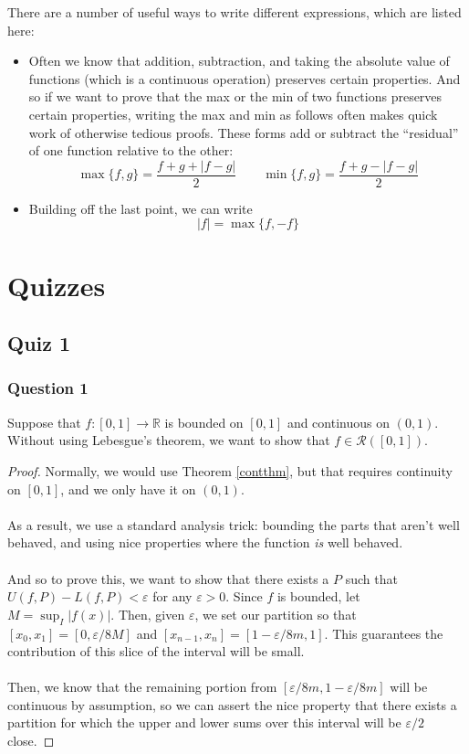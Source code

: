 \documentclass[12pt]{article}
\theoremstyle{plain}
\theoremstyle{definition}
\theoremstyle{remark}
\begin{document}
There are a number of useful ways to write different expressions, which are listed here:
\begin{itemize}
\item Often we know that addition, subtraction, and taking the absolute value of functions (which is a continuous operation) preserves certain properties. And so if we want to prove that the max or the min of two functions preserves certain properties, writing the max and min as follows often makes quick work of otherwise tedious proofs. These forms add or subtract the ``residual'' of one function relative to the other: 
\[
    \max \{f,g\} = \frac{f+g+|f-g|}{2}\qquad 
    \min\{f,g\} = \frac{f+g-|f-g|}{2}
\]

\item Building off the last point, we can write 
    \[ 
        |f|=\max\{f,-f\}
    \]
\end{itemize}

\newpage
\section{Quizzes}

\subsection{Quiz 1}

\subsubsection{Question 1}

Suppose that $f: [0,1]\rightarrow \mathbb{R}$ is bounded on $[0,1]$ and continuous on $(0,1)$. Without using Lebesgue's theorem, we want to show that $f\in\mathscr{R}([0,1])$.
\begin{proof}
Normally, we would use Theorem \ref{contthm}, but that requires continuity on $[0,1]$, and we only have it on $(0,1)$.
\\
\\
As a result, we use a standard analysis trick: bounding the parts that aren't well behaved, and using nice properties where the function \emph{is} well behaved.
\\
\\
And so to prove this, we want to show that there exists a $P$ such that $U(f,P)-L(f,P)<\varepsilon$ for any $\varepsilon>0$. Since $f$ is bounded, let $M = \sup_I |f(x)|$. Then, given $\varepsilon$, we set our partition so that $[x_0, x_1] = [0, \varepsilon/8M]$ and $[x_{n-1}, x_n] = [1-\varepsilon/8m, 1]$. This guarantees the contribution of this slice of the interval will be small.
\\
\\
Then, we know that the remaining portion from $[\varepsilon/8m, 1-\varepsilon/8m]$ will be continuous by assumption, so we can assert the nice property that there exists a partition for which the upper and lower sums over this interval will be $\varepsilon/2$ close.
\end{proof}
\end{document}
